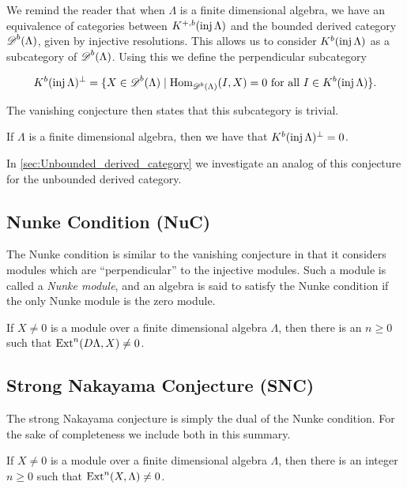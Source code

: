 We remind the reader that when $\Lambda$ is a finite dimensional algebra, we have an equivalence of categories between $K^{+,b}(\operatorname{inj}\Lambda)$ and the bounded derived category $\operatorname{\mathscr{D}}^b(\Lambda)$, given by injective resolutions. This allows us to consider $K^b(\operatorname{inj}\Lambda)$ as a subcategory of $\operatorname{\mathscr{D}}^b(\Lambda)$. Using this we define the perpendicular subcategory

\begin{align*}
	K^b(\operatorname{inj}\Lambda)^\perp = \{X \in \operatorname{\mathscr{D}}^b(\Lambda) \mid \operatorname{Hom}_{\operatorname{\mathscr{D}}^b(\Lambda)}(I, X)=0 \text{ for all } I \in K^b(\operatorname{inj}\Lambda)\}.
\end{align*}

The vanishing conjecture then states that this subcategory is trivial.
\begin{conj} 
	If $\Lambda$ is a finite dimensional algebra, then we have that $K^b(\operatorname{inj}\Lambda)^\perp = 0$.
\end{conj}

In \cref{sec:Unbounded_derived_category} we investigate an analog of this conjecture for the unbounded derived category.

\subsection*{Nunke Condition (NuC)}
The Nunke condition is similar to the vanishing conjecture in that it considers modules which are ``perpendicular'' to the injective modules. Such a module is called a \emph{Nunke module}, and an algebra is said to satisfy the Nunke condition if the only Nunke module is the zero module.

\begin{conj} 
	If $X \neq 0$ is a module over a finite dimensional algebra $\Lambda$, then there is an $n \geq 0$ such that $\operatorname{Ext}^n(D\Lambda, X) \neq 0$. 
\end{conj}

\subsection*{Strong Nakayama Conjecture (SNC)}
The strong Nakayama conjecture is simply the dual of the Nunke condition. For the sake of completeness we include both in this summary.

\begin{conj} 
	If $X \neq 0$ is a module over a finite dimensional algebra $\Lambda$, then there is an integer $n \geq 0$ such that $\operatorname{Ext}^n(X,\Lambda) \neq 0$. 
\end{conj}

